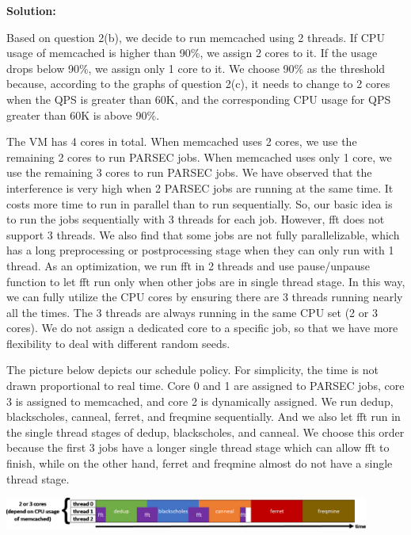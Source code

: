 \documentclass[11pt]{article}
\begin{document}
\begin{enumerate}
    \textbf{Solution:}

Based on question 2(b), we decide to run memcached using 2 threads. If CPU usage of memcached is higher than 90\%, we assign 2 cores to it. If the usage drops below 90\%, we assign only 1 core to it. We choose 90\% as the threshold because, according to the graphs of question 2(c), it needs to change to 2 cores when the QPS is greater than 60K, and the corresponding CPU usage for QPS greater than 60K is above 90\%.

The VM has 4 cores in total. When memcached uses 2 cores, we use the remaining 2 cores to run PARSEC jobs. When memcached uses only 1 core, we use the remaining 3 cores to run PARSEC jobs. We have observed that the interference is very high when 2 PARSEC jobs are running at the same time. It costs more time to run in parallel than to run sequentially. So, our basic idea is to run the jobs sequentially with 3 threads for each job. However, fft does not support 3 threads. We also find that some jobs are not fully parallelizable, which has a long preprocessing or postprocessing stage when they can only run with 1 thread. As an optimization, we run fft in 2 threads and use pause/unpause function to let fft run only when other jobs are in single thread stage. In this way, we can fully utilize the CPU cores by ensuring there are 3  threads running nearly all the times. The 3 threads are always running in the same CPU set (2 or 3 cores). We do not assign a dedicated core to a specific job, so that we have more flexibility to deal with different random seeds.

    The picture below depicts our schedule policy. For simplicity, the time is not drawn proportional to real time. Core 0 and 1 are assigned to PARSEC jobs, core 3 is assigned to memcached, and core 2 is dynamically assigned. We run dedup, blackscholes, canneal, ferret, and freqmine sequentially. And we also let fft run in the single thread stages of dedup, blackscholes, and canneal. We choose this order because the first 3 jobs have a longer single thread stage which can allow fft to finish, while on the other hand, ferret and freqmine almost do not have a single thread stage.

\begin{center}
  \includegraphics[width=0.9\textwidth]{part4q3.png}  
\end{center}



\end{enumerate}
\end{document}
